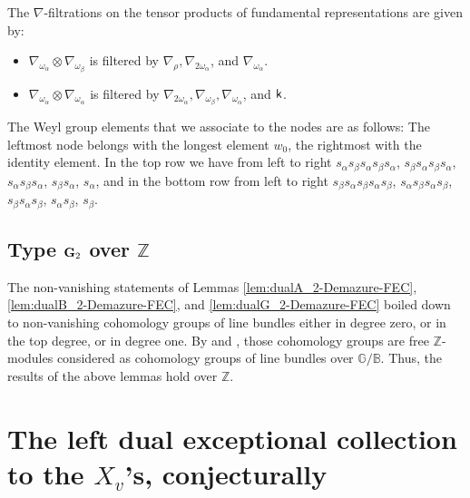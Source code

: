 \documentclass[sn-mathphys-num]{sn-jnl}%
\newcommand{\sk}{{\sf k}}
\newcommand{\Gm}{\mathbb G}
\newcommand{\Bm}{\mathbb B}
\newcommand{\Z}{{\mathbb Z}}
\theoremstyle{definition}
\begin{document}
\vspace{0.4cm}

The $\nabla$-filtrations on the tensor products of fundamental representations are given by:

\begin{itemize}

\item[(1)] $\nabla _{\omega _{\alpha}}\otimes \nabla _{\omega _{\beta}}$ is filtered by $\nabla _{\rho}, \nabla _{2\omega _{\alpha}}$, and $\nabla _{\omega _{\alpha}}$.

\item[(2)]  $\nabla _{\omega _{\alpha}}\otimes \nabla _{\omega _{\alpha}}$ is filtered by $\nabla _{2\omega _{\alpha}},  \nabla _{\omega _{\beta}}, \nabla _{\omega _{\alpha}}$, and $\sk$.

\end{itemize}

The Weyl group elements that we associate to the nodes are
as follows: The leftmost node belongs with the longest element $w_0$, the rightmost with the identity element. In the top row we have from left to right 
$s_\alpha s_\beta s_\alpha s_\beta s_\alpha$, 
$s_\beta  s_\alpha s_\beta s_\alpha $, 
$s_\alpha s_\beta s_\alpha $, 
$ s_\beta s_\alpha$, 
$s_\alpha $, 
and in the bottom row from left to right
$s_\beta s_\alpha s_\beta s_\alpha s_\beta$, 
$s_\alpha s_\beta s_\alpha s_\beta$, 
$s_\beta s_\alpha s_\beta$, 
$s_\alpha s_\beta$, 
$s_\beta$. 
\subsection{ Type ${\bf G}_2$ over $\Z$}

The non-vanishing statements of Lemmas \ref{lem:dualA_2-Demazure-FEC}, \ref{lem:dualB_2-Demazure-FEC}, and \ref{lem:dualG_2-Demazure-FEC} boiled down to non-vanishing cohomology groups of line bundles either in degree zero, or in the top degree, or in degree one. By \cite[Corollary 2.6]{AndChev} and \cite[II, Section 8.8, (6)]{Jan}, those cohomology groups are free $\mathbb Z$-modules considered as cohomology groups of line bundles over $\Gm/\Bm$. Thus, the results of the above lemmas hold over $\Z$.



\section{ The left dual exceptional collection to the $X_v$'s, conjecturally}\label{sec:dualFEC_conj}
\end{document}
